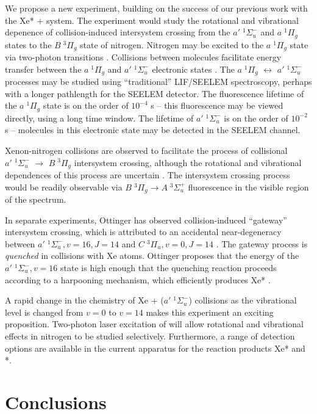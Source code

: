 We propose a new experiment, building on the success of our previous
work with the Xe* +  system.  The experiment would study the
rotational and vibrational depenence of collision-induced intersystem
crossing from the $a' \; ^1\Sigma_u^-$ and $a \; ^1\Pi_g$ states to
the $B \; ^3\Pi_g$ state of nitrogen.  Nitrogen may be excited to the
$a \; ^1\Pi_g$ state via two-photon transitions \cite{vanveen82}.
Collisions between  molecules facilitate energy transfer
between the $a \; ^1\Pi_g$ and $a' \; ^1\Sigma_u^-$ electronic states
\cite{marinelli88}.  The $a \; ^1\Pi_g$ $\leftrightarrow$ $a' \;
^1\Sigma_u^-$ processes may be studied using ``traditional''
LIF/SEELEM spectroscopy, perhaps with a longer pathlength for the
SEELEM detector.  The fluorescence lifetime of the $a \; ^1\Pi_g$
state is on the order of $10^{-4}$ s -- this fluorescence may be
viewed directly, using a long time window.  The lifetime of $a' \;
^1\Sigma_u^-$ is on the order of $10^{-2}$ s -- molecules in this
electronic state may be detected in the SEELEM channel.

Xenon-nitrogen collisions are observed to facilitate the process of
collisional $a' \; ^1\Sigma_u^-$ $\rightarrow$ $B \; ^3\Pi_g$
intersystem crossing, although the rotational and vibrational
dependences of this process are uncertain \cite{umemoto03a}.  The
intersystem crossing process would be readily observable via $B \;
^3\Pi_g \rightarrow A \; ^3\Sigma_u^+$ fluorescence in the visible
region of the spectrum.

In separate experiments, Ottinger has observed collision-induced
``gateway'' intersystem crossing, which is attributed to an accidental
near-degeneracy between $a' \; ^1\Sigma_u^-, v=16, J=14$ and $C \;
^3\Pi_u, v=0, J=14$ \cite{ottinger98}.  The gateway process is
\emph{quenched} in collisions with Xe atoms.  Ottinger proposes that
the energy of the $a' \; ^1\Sigma_u^-, v=16$ state is high enough that
the quenching reaction proceeds according to a harpooning mechanism,
which efficiently produces Xe* \cite{ottinger98}.

A rapid change in the chemistry of Xe + ($a' \; ^1\Sigma_u^-$)
collisions as the vibrational level is changed from $v=0$ to $v=14$
makes this experiment an exciting proposition.  Two-photon laser
excitation of  will allow rotational and vibrational effects in
nitrogen to be studied selectively.  Furthermore, a range of detection
options are available in the current apparatus for the reaction
products Xe* and *.

\section{Conclusions}

